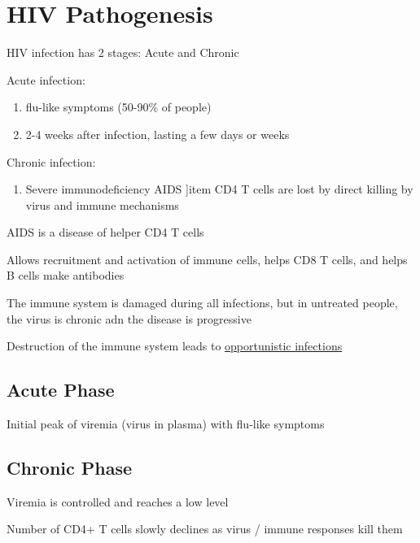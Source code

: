 \documentclass{notes}
\begin{document}


\section{HIV Pathogenesis}

HIV infection has 2 stages: Acute and Chronic

Acute infection:

\begin{enumerate}
    \item flu-like symptoms (50-90\% of people)
    \item 2-4 weeks after infection, lasting a few days or weeks
\end{enumerate}

Chronic infection:

\begin{enumerate}
    \item Severe immunodeficiency \indicates AIDS
    ]item CD4 T cells are lost by direct killing by virus and immune mechanisms
\end{enumerate}

AIDS is a disease of helper CD4 T cells

\tab Allows recruitment and activation of immune cells, helps CD8 T cells, and helps B cells make antibodies

The immune system is damaged during all infections, but in untreated people, the virus is chronic adn the disease is progressive

Destruction of the immune system leads to \underline{opportunistic infections}

\subsection{Acute Phase}

Initial peak of viremia (virus in plasma) with flu-like symptoms

\subsection{Chronic Phase}

Viremia is controlled and reaches a low level

Number of CD4+ T cells slowly declines as virus / immune responses kill them
\end{document}
